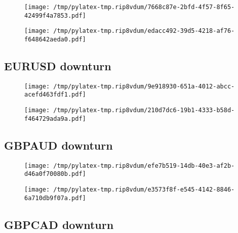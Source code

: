 \documentclass{article}%
\begin{document}
\begin{figure}[htbp]%
\centering%
\texttt{[image: /tmp/pylatex-tmp.rip8vdum/7668c87e-2bfd-4f57-8f65-42499f4a7853.pdf]}%
\end{figure}

%


\begin{figure}[htbp]%
\centering%
\texttt{[image: /tmp/pylatex-tmp.rip8vdum/edacc492-39d5-4218-af76-f648642aeda0.pdf]}%
\end{figure}

%
\newpage %
\subsection{EURUSD downturn}%
\label{subsec:EURUSDdownturn}%


\begin{figure}[htbp]%
\centering%
\texttt{[image: /tmp/pylatex-tmp.rip8vdum/9e918930-651a-4012-abcc-acefd463fdf1.pdf]}%
\end{figure}

%


\begin{figure}[htbp]%
\centering%
\texttt{[image: /tmp/pylatex-tmp.rip8vdum/210d7dc6-19b1-4333-b58d-f464729ada9a.pdf]}%
\end{figure}

%
\newpage %
\subsection{GBPAUD downturn}%
\label{subsec:GBPAUDdownturn}%


\begin{figure}[htbp]%
\centering%
\texttt{[image: /tmp/pylatex-tmp.rip8vdum/efe7b519-14db-40e3-af2b-d46a0f70080b.pdf]}%
\end{figure}

%


\begin{figure}[htbp]%
\centering%
\texttt{[image: /tmp/pylatex-tmp.rip8vdum/e3573f8f-e545-4142-8846-6a710db9f07a.pdf]}%
\end{figure}

%
\newpage %
\subsection{GBPCAD downturn}%
\label{subsec:GBPCADdownturn}%
\end{document}
